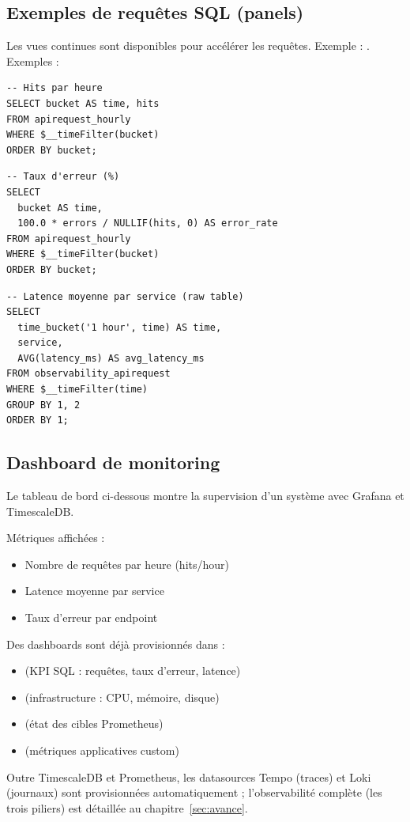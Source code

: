 \subsection{Exemples de requêtes SQL (panels)}
Les vues continues sont disponibles pour accélérer les requêtes.
Exemple : .
Exemples :

\begin{verbatim}
-- Hits par heure
SELECT bucket AS time, hits
FROM apirequest_hourly
WHERE $__timeFilter(bucket)
ORDER BY bucket;
\end{verbatim}

\begin{verbatim}
-- Taux d'erreur (%)
SELECT
  bucket AS time,
  100.0 * errors / NULLIF(hits, 0) AS error_rate
FROM apirequest_hourly
WHERE $__timeFilter(bucket)
ORDER BY bucket;
\end{verbatim}

\begin{verbatim}
-- Latence moyenne par service (raw table)
SELECT
  time_bucket('1 hour', time) AS time,
  service,
  AVG(latency_ms) AS avg_latency_ms
FROM observability_apirequest
WHERE $__timeFilter(time)
GROUP BY 1, 2
ORDER BY 1;
\end{verbatim}

\subsection{Dashboard de monitoring}
Le tableau de bord ci-dessous montre la supervision d’un système avec Grafana et TimescaleDB.

Métriques affichées :
\begin{itemize}
    \item Nombre de requêtes par heure (hits/hour)
    \item Latence moyenne par service
    \item Taux d’erreur par endpoint
\end{itemize}

Des dashboards sont déjà provisionnés dans
 :
\begin{itemize}
    \item {} (KPI SQL : requêtes, taux d'erreur, latence)
    \item {} (infrastructure : CPU, mémoire, disque)
    \item {} (état des cibles Prometheus)
    \item {} (métriques applicatives custom)
\end{itemize}
Outre TimescaleDB et Prometheus, les datasources Tempo (traces) et Loki (journaux)
sont provisionnées automatiquement ; l'observabilité complète (les trois piliers)
est détaillée au chapitre~\ref{sec:avance}.

